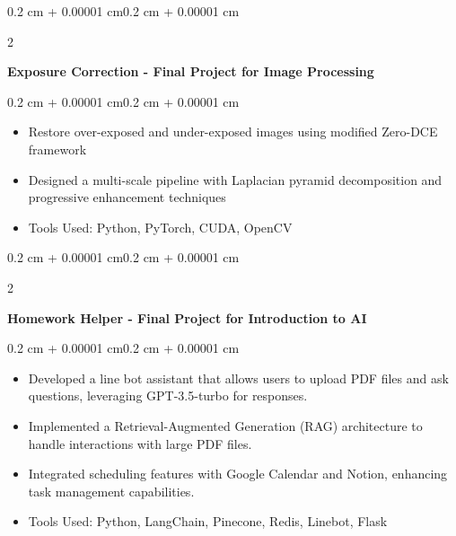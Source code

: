 \documentclass[10pt, letterpaper]{article}
\newenvironment{highlights}{
    \begin{itemize}[
        topsep=0.05 cm,
        parsep=0.05 cm,
        partopsep=0pt,
        itemsep=0pt,
        leftmargin=0.4 cm + 10pt
    ]
}{
    \end{itemize}
}
\newenvironment{onecolentry}{
    \begin{adjustwidth}{0.2 cm + 0.00001 cm}{0.2 cm + 0.00001 cm}
}{
    \end{adjustwidth}
}
\newenvironment{twocolentry}[2][]{
    \onecolentry
    \def\secondColumn{#2}
    \setcolumnwidth{\fill, 4.5 cm}
    \begin{paracol}{2}
}{
    \switchcolumn \raggedleft \secondColumn
    \end{paracol}
    \endonecolentry
}
\let\hrefWithoutArrow\href
\renewcommand{\href}[2]{\hrefWithoutArrow{#1}{\ifthenelse{\equal{#2}{}}{ }{#2 }\raisebox{.15ex}{\footnotesize \faExternalLink*}}}
\begin{document}
        \vspace{0.10 cm}
        \begin{twocolentry}{
        \textit{\href{https://github.com/ChuEating1005/Exposure-Correction}{Link}}}
            \textbf{Exposure Correction - Final Project for Image Processing} 
        \end{twocolentry}
        \vspace{0.05 cm}
        \begin{onecolentry}
            \begin{highlights}
                \item Restore over-exposed and under-exposed images using modified Zero-DCE framework
                \item Designed a multi-scale pipeline with Laplacian pyramid decomposition and progressive enhancement techniques
                \item Tools Used: Python, PyTorch, CUDA, OpenCV
            \end{highlights}
        \end{onecolentry}
        
        \vspace{0.10 cm}
        \begin{twocolentry}{
        \textit{\href{https://github.com/ChuEating1005/Homework-Helper}{Link}}}
            \textbf{Homework Helper - Final Project for Introduction to AI}
        \end{twocolentry}
        \vspace{0.05 cm}
        \begin{onecolentry}
            \begin{highlights}
                \item Developed a line bot assistant that allows users to upload PDF files and ask questions, leveraging GPT-3.5-turbo for responses.
                \item Implemented a Retrieval-Augmented Generation (RAG) architecture to handle interactions with large PDF files.
                \item Integrated scheduling features with Google Calendar and Notion, enhancing task management capabilities.
                \item Tools Used: Python, LangChain, Pinecone, Redis, Linebot, Flask
            \end{highlights}
        \end{onecolentry}
        
\end{document}
